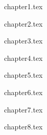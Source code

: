 \documentclass[11pt,twoside,a4paper]{report}
\begin{document}
\cleardoublepage
{}


{chapter1.tex}

{chapter2.tex}

{chapter3.tex}

{chapter4.tex}

{chapter5.tex}

{chapter6.tex}

{chapter7.tex}

{chapter8.tex}


\renewcommand{\bibname}{Referências}


\cleardoublepage
\end{document}
